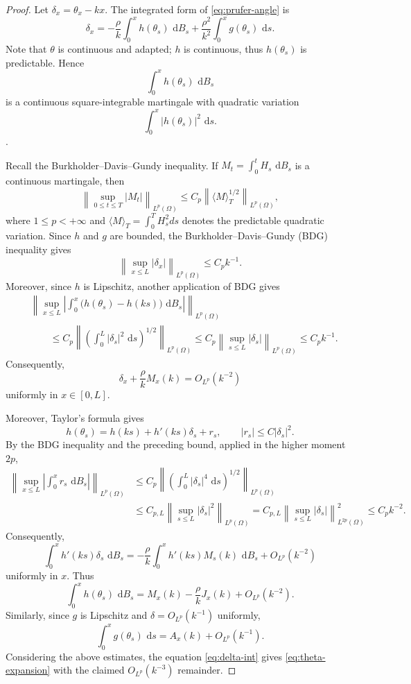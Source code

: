 \documentclass[11pt]{article}
\newcommand{\dd}{\,\mathrm d}
\begin{document}
\begin{proof}
Let $\delta_x=\theta_x-kx$. The integrated form of \eqref{eq:prufer-angle} is
\begin{equation}\label{eq:delta-int}
    \delta_x=-\frac{\rho}{k}\int_0^xh(\theta_s)\,\dd B_s
    +\frac{\rho^2}{k^2}\int_0^xg(\theta_s)\,\dd s.
\end{equation}
Note that $\theta$ is continuous and adapted; $h$ is continuous, thus $h(\theta_s)$ is predictable.
Hence
\[
\int_0^x h(\theta_s)\,\dd B_s
\]
is a continuous square-integrable martingale with quadratic variation
\[
    \int_0^x |h(\theta_s)|^2\,\dd s.
\]. 

Recall the Burkholder--Davis--Gundy inequality. If $M_t=\int_0^t H_s\,\dd B_s$ is a continuous martingale, then
\[
  \left\|
\sup_{0\le t\le T}|M_t|
\right\|_{L^p(\Omega)}
\le
C_p
\left\|
\langle M\rangle_T^{1/2}
\right\|_{L^p(\Omega)},
\]
where $1 \le p < +\infty$ and $\langle M\rangle_T =\int _0^T H_s^2 ds$ denotes the predictable quadratic variation.
Since $h$ and $g$ are bounded, the Burkholder--Davis--Gundy (BDG) inequality gives
\[
    \left\|\sup_{x\le L}|\delta_x|\right\|_{L^p(\Omega)}\le C_pk^{-1}.
\]
Moreover, since $h$ is Lipschitz, another application of BDG gives
\[
\begin{aligned}
&\left\|\sup_{x\le L}
\left|\int_0^x\bigl(h(\theta_s)-h(ks)\bigr)\,\dd B_s\right|
\right\|_{L^p(\Omega)}  \\
&\qquad\le C_p
\left\|
\left(\int_0^L |\delta_s|^2\,\dd s\right)^{1/2}
\right\|_{L^p(\Omega)}
\le C_p\left\|\sup_{s\le L}|\delta_s|\right\|_{L^p(\Omega)}
\le C_pk^{-1}.
\end{aligned}
\]
Consequently,
\[
    \delta_x+\frac{\rho}{k}M_x(k)=O_{L^p}(k^{-2})
\]
uniformly in $x\in[0,L]$.

Moreover, Taylor's formula gives
\[
    h(\theta_s)=h(ks)+h'(ks)\delta_s+r_s,
    \qquad |r_s|\le C|\delta_s|^2.
\]
By the BDG inequality and the preceding bound, applied in the higher moment $2p$,
\[
\begin{aligned}
    \left\|\sup_{x\le L}\left|\int_0^xr_s\,\dd B_s\right|\right\|_{L^p(\Omega)}
    &\le C_p\left\|\left(\int_0^L|\delta_s|^4\,\dd s\right)^{1/2}\right\|_{L^p(\Omega)} \\
    &\le C_{p,L}\left\|\sup_{s\le L}|\delta_s|^2\right\|_{L^p(\Omega)}
     = C_{p,L}\left\|\sup_{s\le L}|\delta_s|\right\|_{L^{2p}(\Omega)}^2
    \le C_pk^{-2}.
\end{aligned}
\]
Consequently,
\[
    \int_0^xh'(ks)\delta_s\,\dd B_s
    =-\frac{\rho}{k}\int_0^xh'(ks)M_s(k)\,\dd B_s+O_{L^p}(k^{-2})
\]
uniformly in $x$. Thus
\[
    \int_0^xh(\theta_s)\,\dd B_s
    =M_x(k)-\frac{\rho}{k}J_x(k)+O_{L^p}(k^{-2}).
\]
Similarly, since $g$ is Lipschitz and $\delta=O_{L^p}(k^{-1})$ uniformly,
\[
    \int_0^xg(\theta_s)\,\dd s
    =A_x(k)+O_{L^p}(k^{-1}).
\]
Considering the above estimates, the equation \eqref{eq:delta-int} gives \eqref{eq:theta-expansion} with the claimed $O_{L^p}(k^{-3})$ remainder.


\end{proof}
\end{document}
